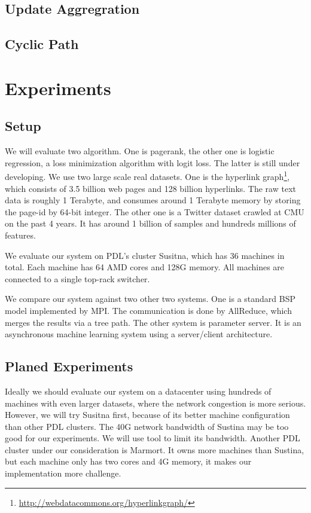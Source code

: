 \documentclass{acm_proc_article-sp}
\begin{document}
\subsection{Update Aggregration}
\label{sec:update-aggreg}

\subsection{Cyclic Path}
\label{sec:cyclic-path}

\section{Experiments}

\subsection{Setup}

We will evaluate two algorithm. One is pagerank, the other one is logistic
regression, a loss minimization algorithm with logit loss. The latter is still
under developing. We use two large scale real datasets. One is the hyperlink
graph\footnote{\url{http://webdatacommons.org/hyperlinkgraph/}}, which consists
of 3.5 billion web pages and 128 billion hyperlinks. The raw text data is
roughly 1 Terabyte, and consumes around 1 Terabyte memory by storing the page-id
by 64-bit integer. The other one is a Twitter dataset crawled at CMU on the past
4 years. It has around 1 billion of samples and hundreds millions of
features.

We evaluate our system on PDL's cluster Susitna, which has 36 machines in
total. Each machine has 64 AMD cores and 128G memory. All machines are connected
to a single top-rack switcher.

We compare our system against two other two systems. One is a standard BSP
model implemented by MPI. The communication is done by AllReduce, which merges
the results via a tree path. The other system is parameter server. It is an
asynchronous machine learning system using a server/client architecture.

\subsection{Planed Experiments}

Ideally we should evaluate our system on a datacenter using hundreds of
machines with even larger datasets, where the network congestion is more
serious. However, we will try Susitna first, because of its better machine
configuration than other PDL clusters. The 40G network bandwidth of Sustina may
be too good for our experiments. We will use tool to limit its
bandwidth. Another PDL cluster under our consideration is Marmort. It owns more
machines than Sustina, but each machine only has two cores and 4G memory, it
makes our implementation more challenge.
\end{document}
